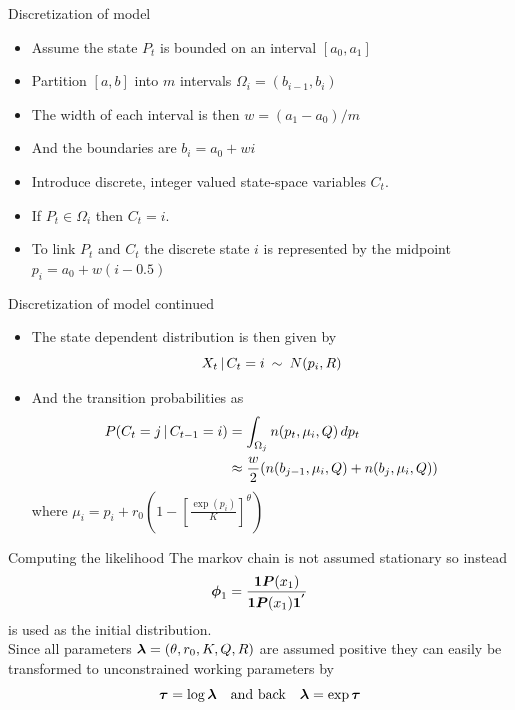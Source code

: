 \begin{frame}{Discretization of model}
    \begin{itemize}
        \item Assume the state $P_t$ is bounded on an interval $[a_0,a_1]$
        \item Partition $[a,b]$ into $m$ intervals $\Omega_i=(b_{i-1},b_i)$
        \item The width of each interval is then $w=(a_1-a_0)/m$
        \item And the boundaries are $b_i=a_0+wi$
        \item Introduce discrete, integer valued state-space variables $C_t$.
        \item If $P_t\in\Omega_i$ then $C_t=i$.
        \item To link $P_t$ and $C_t$ the discrete state $i$ is represented by the midpoint $p_i=a_0+w(i-0.5)$
    \end{itemize}
\end{frame}

\begin{frame}{Discretization of model continued}
    \begin{itemize}
        \item The state dependent distribution is then given by
        \begin{equation*}
            X_t\,|\, C_t=i\:\sim\:N(p_i, R)
        \end{equation*}
        \item And the transition probabilities as
        \begin{align*}
            P(C_t=j\,|\, C_{t-1}=i) &= \int_{\Omega_j} n(p_t, \mu_i, Q)\,dp_t \\
                &\approx \frac{w}{2}(n(b_{j-1}, \mu_i, Q) + n(b_j, \mu_i, Q))
        \end{align*}
        where $\mu_i = p_i + r_0\left(1-\left[\frac{\exp(p_i)}{K}\right]^\theta\right)$
    \end{itemize}
\end{frame}

\begin{frame}{Computing the likelihood}
    The markov chain is not assumed stationary so instead
    \begin{equation*}
        \boldsymbol{\phi}_1 = \frac{\boldsymbol{1}\boldsymbol{P}(x_1)}{\boldsymbol{1}\boldsymbol{P}(x_1)\boldsymbol{1^{'}}}
    \end{equation*}
    is used as the initial distribution.
    \\
    Since all parameters $\boldsymbol{\lambda} = (\theta, r_0, K, Q, R)$ are assumed positive they can easily be transformed to unconstrained working parameters by 
    \begin{equation*}
        \boldsymbol{\tau}=\log\boldsymbol{\lambda}\quad\text{and back}\quad \boldsymbol{\lambda}=\exp{\boldsymbol{\tau}}
    \end{equation*}
\end{frame}

